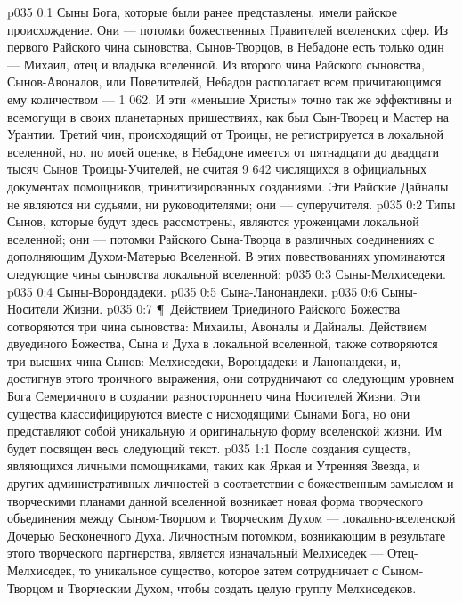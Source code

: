 \author{Глава Архангелов}
\vs p035 0:1 Сыны Бога, которые были ранее представлены, имели райское происхождение. Они --- потомки божественных Правителей вселенских сфер. Из первого Райского чина сыновства, Сынов\hyp{}Творцов, в Небадоне есть только один --- Михаил, отец и владыка вселенной. Из второго чина Райского сыновства, Сынов\hyp{}Авоналов, или Повелителей, Небадон располагает всем причитающимся ему количеством --- 1 062. И эти «меньшие Христы» точно так же эффективны и всемогущи в своих планетарных пришествиях, как был Сын\hyp{}Творец и Мастер на Урантии. Третий чин, происходящий от Троицы, не регистрируется в локальной вселенной, но, по моей оценке, в Небадоне имеется от пятнадцати до двадцати тысяч Сынов Троицы\hyp{}Учителей, не считая 9 642 числящихся в официальных документах помощников, тринитизированных созданиями. Эти Райские Дайналы не являются ни судьями, ни руководителями; они --- суперучителя.
\vs p035 0:2 Типы Сынов, которые будут здесь рассмотрены, являются уроженцами локальной вселенной; они --- потомки Райского Сына\hyp{}Творца в различных соединениях с дополняющим Духом\hyp{}Матерью Вселенной. В этих повествованиях упоминаются следующие чины сыновства локальной вселенной:
\vs p035 0:3 \bibnobreakspace Сыны\hyp{}Мелхиседеки.
\vs p035 0:4 \bibnobreakspace Сыны\hyp{}Ворондадеки.
\vs p035 0:5 \bibnobreakspace Сына\hyp{}Ланонандеки.
\vs p035 0:6 \bibnobreakspace Сыны\hyp{}Носители Жизни.
\vs p035 0:7 \P\ Действием Триединого Райского Божества сотворяются три чина сыновства: Михаилы, Авоналы и Дайналы. Действием двуединого Божества, Сына и Духа в локальной вселенной, также сотворяются три высших чина Сынов: Мелхиседеки, Ворондадеки и Ланонандеки, и, достигнув этого троичного выражения, они сотрудничают со следующим уровнем Бога Семеричного в создании разностороннего чина Носителей Жизни. Эти существа классифицируются вместе с нисходящими Сынами Бога, но они представляют собой уникальную и оригинальную форму вселенской жизни. Им будет посвящен весь следующий текст.
\vs p035 1:1 После создания существ, являющихся личными помощниками, таких как Яркая и Утренняя Звезда, и других административных личностей в соответствии с божественным замыслом и творческими планами данной вселенной возникает новая форма творческого объединения между Сыном\hyp{}Творцом и Творческим Духом --- локально\hyp{}вселенской Дочерью Бесконечного Духа. Личностным потомком, возникающим в результате этого творческого партнерства, является изначальный Мелхиседек --- Отец\hyp{}Мелхиседек, то уникальное существо, которое затем сотрудничает с Сыном\hyp{}Творцом и Творческим Духом, чтобы создать целую группу Мелхиседеков.
